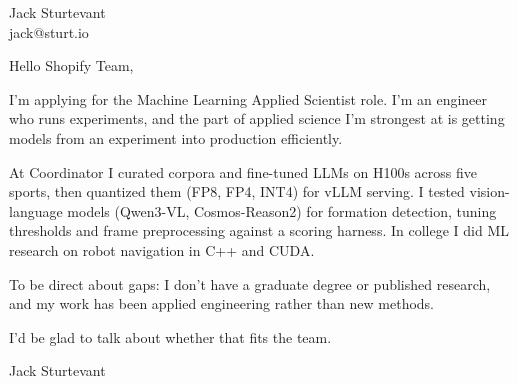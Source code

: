 \documentclass[11pt]{article}
\begin{document}
\raggedright

{\namefont\fontsize{20pt}{24pt}\selectfont Jack Sturtevant}\\[-0.3em]
jack@sturt.io

\vspace{1.2em}

Hello Shopify Team,

I'm applying for the Machine Learning Applied Scientist role. I'm an engineer who runs experiments, and the part of applied science I'm strongest at is getting models from an experiment into production efficiently.

At Coordinator I curated corpora and fine-tuned LLMs on H100s across five sports, then quantized them (FP8, FP4, INT4) for vLLM serving. I tested vision-language models (Qwen3-VL, Cosmos-Reason2) for formation detection, tuning thresholds and frame preprocessing against a scoring harness. In college I did ML research on robot navigation in C++ and CUDA.

To be direct about gaps: I don't have a graduate degree or published research, and my work has been applied engineering rather than new methods.

I'd be glad to talk about whether that fits the team.

\vspace{0.6em}
Jack Sturtevant
\end{document}
